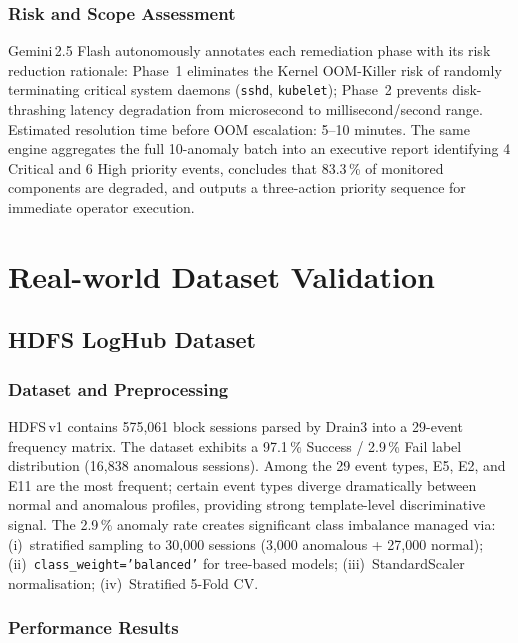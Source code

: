 \documentclass[5p, times]{elsarticle}
\begin{document}
\subsubsection{Risk and Scope Assessment}
Gemini\,2.5 Flash autonomously annotates each remediation phase with its risk reduction rationale: Phase~1 eliminates the Kernel
OOM-Killer risk of randomly terminating critical system daemons (\texttt{sshd}, \texttt{kubelet}); Phase~2 prevents disk-thrashing latency degradation from microsecond to millisecond/second range. Estimated resolution time before OOM escalation:
5--10 minutes. The same engine aggregates the full
10-anomaly batch into an executive report identifying 4 Critical and 6 High priority events, concludes that 83.3\,\% of monitored components are degraded, and outputs a three-action priority
sequence for immediate operator execution.

\section{Real-world Dataset Validation}
\label{sec:realdata}

\subsection{HDFS LogHub Dataset}

\subsubsection{Dataset and Preprocessing}
HDFS\,v1 contains 575{,}061 block sessions parsed by Drain3 into a 29-event frequency matrix. The dataset exhibits a 97.1\,\% Success / 2.9\,\% Fail label distribution (16{,}838 anomalous sessions). Among the 29 event types, E5, E2, and E11 are the most
frequent; certain event types diverge dramatically between normal and anomalous profiles, providing strong template-level discriminative signal. The 2.9\,\% anomaly rate creates significant class imbalance managed via: (i)~stratified sampling to 30,000 sessions (3{,}000 anomalous + 27{,}000 normal); (ii)~\texttt{class\_weight='balanced'} for tree-based models; (iii)~StandardScaler normalisation; (iv)~Stratified 5-Fold CV.

\subsubsection{Performance Results}
\end{document}

